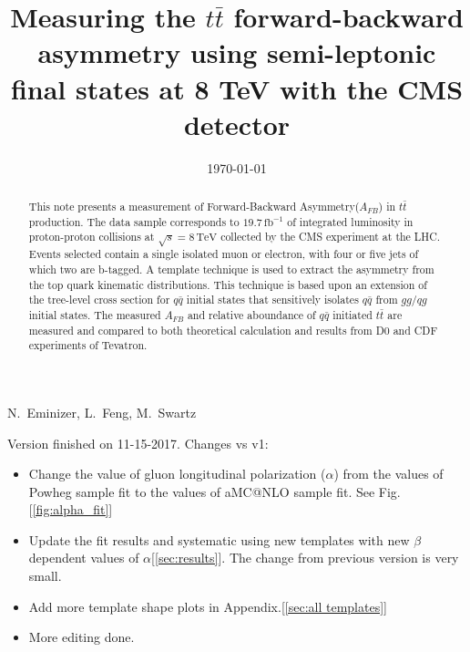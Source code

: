 \documentclass{cmspaperpdf}
\begin{document}
\begin{titlepage}

  \date{\today}

  \title{Measuring the $t\bar{t}$ forward-backward asymmetry using semi-leptonic final states at 8 TeV with the CMS detector }

  \begin{Authlist}
    N.~Eminizer, L.~Feng, M.~Swartz
  \end{Authlist}


  \begin{abstract}
This note presents a measurement of Forward-Backward Asymmetry($\displaystyle{A_{FB}}$) in $t\bar{t}$ production. The data sample corresponds to $19.7\,\textrm{fb}^{-1}$ of integrated luminosity in proton-proton collisions at $\sqrt{s} = 8\,\textrm{TeV}$ collected by the CMS experiment at the LHC. Events selected contain a single isolated muon or electron, with four or five jets of which two are b-tagged. A template technique is used to extract the asymmetry from the top quark kinematic distributions. This technique is based upon an extension of the tree-level cross section for $q\bar{q}$ initial states that sensitively isolates $q\bar{q}$ from $gg/qg$ initial states. The measured $A_{FB}$ and relative aboundance of $q\bar{q}$ initiated $t\bar{t}$ are measured and compared to both theoretical calculation and results from D0 and CDF experiments of Tevatron.
  \end{abstract} 

  
\end{titlepage}

\clearpage

Version finished on 11-15-2017. Changes vs v1:


\begin{itemize}
\item Change the value of gluon longitudinal polarization ($\alpha$) from the values of Powheg sample fit to the values of aMC@NLO sample fit. See Fig.[\ref{fig:alpha_fit}]
\item Update the fit results and systematic using new templates with new $\beta$ dependent values of $\alpha$[\ref{sec:results}]. The change from previous version is very small.
\item Add more template shape plots in Appendix.[\ref{sec:all templates}]
\item More editing done. 
\end{itemize}
\end{document}
